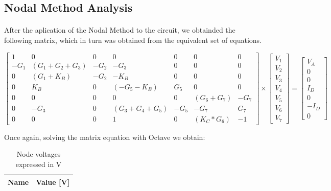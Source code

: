 \subsection{Nodal Method Analysis}

\paragraph{} After the aplication of the Nodal Method to the circuit, we obtainded the following matrix, which in turn was obtained from the equivalent set of equations.

\begin{equation}
\begin{bmatrix}
	1 & 0 & 0 & 0 & 0 & 0 & 0 \\
	-G_1 & (G_1 + G_2+G_3) & -G_2 & -G_3 & 0 & 0 & 0 \\
	0 & (G_1 + K_B) & -G_2 & -K_B & 0 & 0 & 0 \\
	0 & K_B & 0 & (-G_5 - K_B) & G_5 & 0 & 0 \\
	0 & 0 & 0 & 0 & 0 & (G_6 + G_7) & -G_7 \\
	0 & -G_3 & 0 & (G_3 + G_4 + G_5) & -G_5 & -G_7 & G_7 \\
	0 & 0 & 0 & 1 & 0 & (K_C * G_6) & -1
\end{bmatrix}
\times
\begin{bmatrix}
	V_1 \\
	V_2 \\
	V_3 \\
	V_4 \\
	V_5 \\
	V_6 \\
	V_7
\end{bmatrix}
=
\begin{bmatrix}
	V_A \\
	0 \\
	0 \\
	I_D \\
	0 \\
	-I_D \\
	0
	\label{m:2}
\end{bmatrix}
\end{equation}

Once again, solving the matrix equation with Octave we obtain:

\begin{table}[th!]
  \centering
  \begin{tabular}{|l|r|}
    \hline    
    {\bf Name} & {\bf Value [V]} \\ \hline
    
  \end{tabular}
  \caption{Node voltages expressed in V}
  \label{tab:op}
\end{table}

